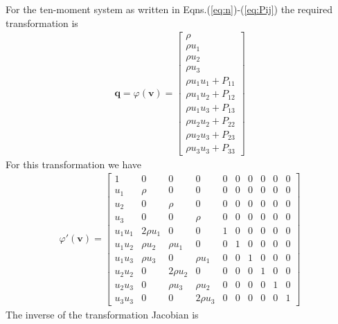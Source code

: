 \documentclass[11pt, reqno]{amsart}
\newcommand{\mvec}[1]{\mathbf{#1}}
\theoremstyle{definition}
\begin{document}
For the ten-moment system as written in
Eqns.\thinspace(\ref{eq:n})-(\ref{eq:Pij}) the required transformation
is
\begin{align}
  \mvec{q} = \varphi(\mvec{v})
  =
  \left[
    \begin{matrix}
      \rho \\
      \rho u_1 \\
      \rho u_2 \\
      \rho u_3 \\
      \rho u_1u_1 + P_{11} \\
      \rho u_1u_2 + P_{12} \\
      \rho u_1u_3 + P_{13} \\
      \rho u_2u_2 + P_{22} \\
      \rho u_2u_3 + P_{23} \\
      \rho u_3u_3 + P_{33}
    \end{matrix}
  \right]
\end{align}
For this transformation we have
\begin{align}
  \varphi'(\mvec{v}) = 
    \left[
    \begin{matrix}
      1         & 0          & 0         & 0         & 0 & 0 & 0 & 0 & 0 & 0 \\
      u_1       & \rho       & 0         & 0         & 0 & 0 & 0 & 0 & 0 & 0 \\
      u_2       & 0          & \rho      & 0         & 0 & 0 & 0 & 0 & 0 & 0 \\
      u_3       & 0          & 0         & \rho      & 0 & 0 & 0 & 0 & 0 & 0 \\
      u_1u_1    & 2\rho u_1  & 0         & 0         & 1 & 0 & 0 & 0 & 0 & 0 \\
      u_1u_2    & \rho u_2   & \rho u_1  & 0         & 0 & 1 & 0 & 0 & 0 & 0 \\
      u_1u_3    & \rho u_3   & 0         & \rho u_1  & 0 & 0 & 1 & 0 & 0 & 0 \\
      u_2u_2    & 0          & 2\rho u_2 & 0         & 0 & 0 & 0 & 1 & 0 & 0 \\
      u_2u_3    & 0          & \rho u_3  & \rho u_2  & 0 & 0 & 0 & 0 & 1 & 0\\
      u_3u_3    & 0          & 0         & 2\rho u_3 & 0 & 0 & 0 & 0 & 0 & 1
    \end{matrix}
  \right]
\end{align}
The inverse of the transformation Jacobian is
\end{document}
